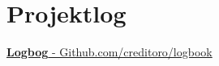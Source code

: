 \section{Projektlog}
\href{https://github.com/creditoro/logbook}{\textbf{Logbog} - Github.com/creditoro/logbook}